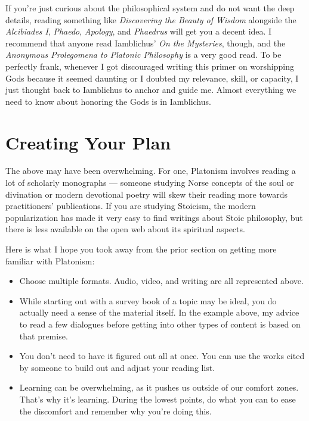 \documentclass[
]{book}
\providecommand{\tightlist}{%
  \setlength{\itemsep}{0pt}\setlength{\parskip}{0pt}}
\begin{document}
If you're just curious about the philosophical system and do not want the deep details, reading something like \emph{Discovering the Beauty of Wisdom} alongside the \emph{Alcibiades I}, \emph{Phaedo}, \emph{Apology}, and \emph{Phaedrus} will get you a decent idea. I recommend that anyone read Iamblichus' \emph{On the Mysteries}, though, and the \emph{Anonymous Prolegomena to Platonic Philosophy} is a very good read. To be perfectly frank, whenever I got discouraged writing this primer on worshipping Gods because it seemed daunting or I doubted my relevance, skill, or capacity, I just thought back to Iamblichus to anchor and guide me. Almost everything we need to know about honoring the Gods is in Iamblichus.

\hypertarget{creating-your-plan}{%
\section{Creating Your Plan}\label{creating-your-plan}}

The above may have been overwhelming. For one, Platonism involves reading a lot of scholarly monographs --- someone studying Norse concepts of the soul or divination or modern devotional poetry will skew their reading more towards practitioners' publications. If you are studying Stoicism, the modern popularization has made it very easy to find writings about Stoic philosophy, but there is less available on the open web about its spiritual aspects.

Here is what I hope you took away from the prior section on getting more familiar with Platonism:

\begin{itemize}
\tightlist
\item
  Choose multiple formats. Audio, video, and writing are all represented above.
\item
  While starting out with a survey book of a topic may be ideal, you do actually need a sense of the material itself. In the example above, my advice to read a few dialogues before getting into other types of content is based on that premise.
\item
  You don't need to have it figured out all at once. You can use the works cited by someone to build out and adjust your reading list.
\item
  Learning can be overwhelming, as it pushes us outside of our comfort zones. That's why it's learning. During the lowest points, do what you can to ease the discomfort and remember why you're doing this.
\end{itemize}
\end{document}
